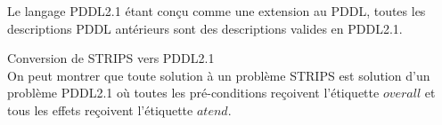 %
%

Le langage PDDL2.1 étant conçu comme une extension au PDDL, toutes les descriptions PDDL antérieurs sont des descriptions valides en PDDL2.1.

\begin{theo}Conversion de STRIPS vers PDDL2.1\\
	On peut montrer que toute solution à un problème STRIPS est solution d'un problème PDDL2.1 où toutes les pré-conditions reçoivent l'étiquette $overall$ et tous les effets reçoivent l'étiquette $atend$.
\end{theo}

